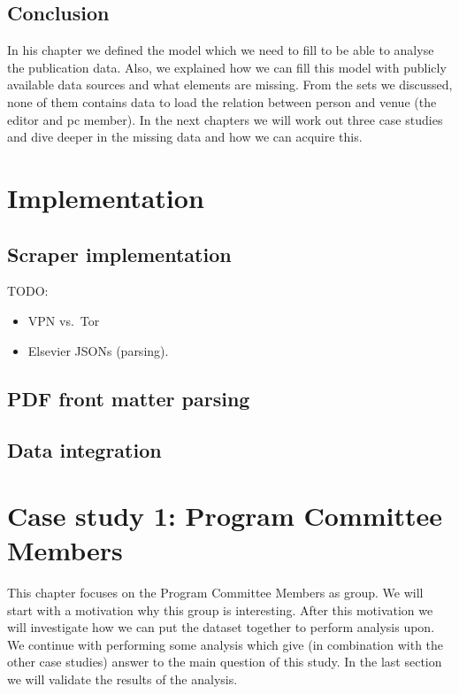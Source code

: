 \documentclass{ou-report}
\newcommand{\todo}[1]{{\color{red} TODO: #1}}
\begin{document}
\section{Conclusion}
In his chapter we defined the model which we need to fill to be able to 
analyse the publication data. Also, we explained how we can fill this model
with publicly available data sources and what elements are missing. From the 
sets we discussed, none of them contains data to load the relation between 
person and venue (the editor and pc member).
In the next chapters we will work out three case studies and dive deeper in 
the missing data and how we can acquire this.



\chapter{Implementation}
\section{Scraper implementation}
\todo{
\begin{itemize}
\item VPN vs.~Tor
\item Elsevier JSONs (parsing).
\end{itemize}
}
\section{PDF front matter parsing}
\section{Data integration}

\chapter{Case study 1: Program Committee Members}
\label{chp:case1}
This chapter focuses on the Program Committee Members as group. We will start 
with a motivation why this group is interesting. After this motivation we will
investigate how we can put the dataset together to perform analysis upon. 
We continue with performing some analysis which give (in combination with the 
other case studies) answer to the main question of this study. In the last 
section we will validate the results of the analysis.
\end{document}
